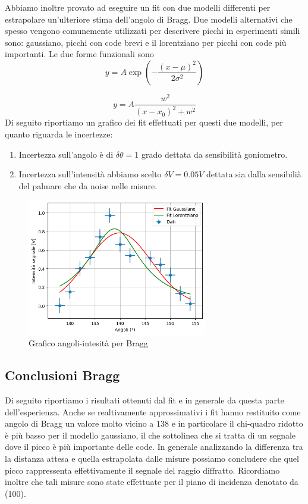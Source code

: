 \documentclass[letterpaper,12pt]{article}
\begin{document}
Abbiamo inoltre provato ad eseguire un fit con due modelli differenti per estrapolare un'ulteriore stima dell'angolo di Bragg.
Due modelli alternativi che spesso vengono comunemente utilizzati per descrivere picchi in esperimenti simili sono: gaussiano, picchi con code brevi e il lorentziano per picchi con code più importanti.
Le due forme funzionali sono
\begin{equation}
	y = A \exp\left(-\frac{(x - \mu)^2}{2\sigma^2}\right)
	\end{equation}
	
	\begin{equation}
	y = A \frac{w^2}{(x - x_0)^2 + w^2}
	\end{equation}
Di seguito riportiamo un grafico dei fit effettuati per questi due modelli, per quanto riguarda le incertezze:
\begin{enumerate}
	\item Incertezza sull'angolo è di $\delta\theta= 1$ grado dettata da sensibilità goniometro.
	\item Incertezza sull'intensità abbiamo scelto $\delta V = 0.05 V$ dettata sia dalla sensibilià del palmare che da noise nelle misure.
\end{enumerate}
\begin{figure}[h!]
	\centering
	\includegraphics[width = 0.7\textwidth]{graf_bragg.png}
	\caption{Grafico angoli-intesità per Bragg}
	\label{fig:GraficoBragg4}
\end{figure}

\subsection{Conclusioni Bragg}
Di seguito riportiamo i risultati ottenuti dal fit e in generale da questa parte dell'esperienza.
Anche se realtivamente approssimativi i fit hanno restituito come angolo di Bragg un valore molto vicino a $138$
e in particolare il chi-quadro ridotto è più basso per il modello gaussiano, il che sottolinea che si tratta di un segnale dove il picco è più importante delle code.
In generale analizzando la differenza tra la distanza attesa e quella estrapolata dalle misure possiamo concludere che quel picco 
rappressenta effettivamente il segnale del raggio diffratto. Ricordiamo inoltre che tali misure sono state effettuate per il piano di incidenza denotato da 
(100).
\end{document}
